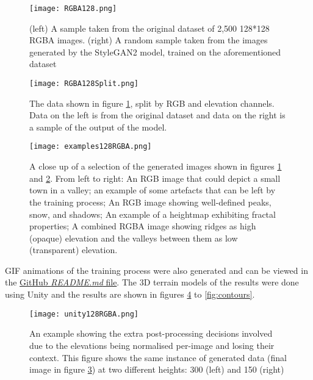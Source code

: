 \documentclass[a4paper]{report}
\begin{document}
\begin{figure}[H]
    \centering
        \texttt{[image: RGBA128.png]}
        \caption{(left) A sample taken from the original dataset of 2,500 128*128 RGBA images. (right) A random sample taken from the images generated by the StyleGAN2 model, trained on the aforementioned dataset}
        \label{fig:RGBA128}
\end{figure}

\begin{figure}[H]
    \centering
        \texttt{[image: RGBA128Split.png]}
        \caption{The data shown in figure \ref{fig:RGBA128}, split by RGB and elevation channels. Data on the left is from the original dataset and data on the right is a sample of the output of the model.}
        \label{fig:RGBA128Split}
\end{figure}

\begin{figure}[H]
    \centering
        \texttt{[image: examples128RGBA.png]}
        \caption{A close up of a selection of the generated images shown in figures \ref{fig:RGBA128} and \ref{fig:RGBA128Split}. From left to right: An RGB image that could depict a small town in a valley; an example of some artefacts that can be left by the training process; An RGB image showing well-defined peaks, snow, and shadows; An example of a heightmap exhibiting fractal properties; A combined RGBA image showing ridges as high (opaque) elevation and the valleys between them as low (transparent) elevation.}
        \label{fig:RGBA128Ex}
\end{figure}

GIF animations of the training process were also generated and can be viewed in the \href{https://github.com/hulleylm/landgan}{GitHub \textit{README.md} file}. The 3D terrain models of the results were done using Unity and the results are shown in figures \ref{fig:unity128RGBA} to \ref{fig:contours}.

\begin{figure}[H]
    \centering
        \texttt{[image: unity128RGBA.png]}
        \caption{An example showing the extra post-processing decisions involved due to the elevations being normalised per-image and losing their context. This figure shows the same instance of generated data (final image in figure \ref{fig:RGBA128Ex}) at two different heights: 300 (left) and 150 (right)}
        \label{fig:unity128RGBA}
\end{figure}
\end{document}
